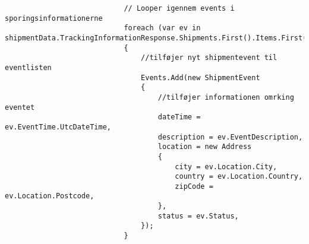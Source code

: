 \begin{verbatim}
                            // Looper igennem events i sporingsinformationerne
                            foreach (var ev in shipmentData.TrackingInformationResponse.Shipments.First().Items.First().Events)
                            {
                                //tilføjer nyt shipmentevent til eventlisten
                                Events.Add(new ShipmentEvent
                                {
                                    //tilføjer informationen omrking eventet
                                    dateTime = ev.EventTime.UtcDateTime,
                                    description = ev.EventDescription,
                                    location = new Address
                                    {
                                        city = ev.Location.City,
                                        country = ev.Location.Country,
                                        zipCode = ev.Location.Postcode,
                                    },
                                    status = ev.Status,
                                });
                            }
        

\end{verbatim}
